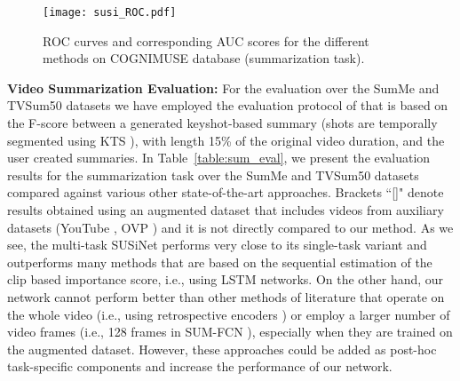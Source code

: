 \documentclass[10pt,twocolumn,letterpaper]{article}
\begin{document}
\begin{figure}[t]
\begin{center}
\hspace{-1cm}
\texttt{[image: susi\_ROC.pdf]}
\end{center}
\vspace{-0.4cm}
   \caption{ROC curves and corresponding AUC scores for the different methods on \mbox{COGNIMUSE} database (summarization task).}
\label{fig:roc_cogn}
\vspace{-0.3cm}
\end{figure}

\noindent\textbf{Video Summarization Evaluation:} For the evaluation over the SumMe and TVSum50 datasets we have employed the evaluation protocol of \cite{zhang2016video} that is based on the F-score between a generated keyshot-based summary (shots are temporally segmented using KTS \cite{potapov2014category}), with length 15\% of the original video duration, and the user created summaries. In Table~\ref{table:sum_eval}, we present the evaluation results for the summarization task over the SumMe and TVSum50 datasets compared against various other state-of-the-art approaches. Brackets ``[]" denote results obtained using an augmented dataset that includes videos from auxiliary datasets (YouTube \cite{de2011vsumm}, OVP \cite{de2011vsumm,ovp}) and it is not directly compared to our method. As we see, the multi-task SUSiNet performs very close to its single-task variant and outperforms many methods that are based on the sequential estimation of the clip based importance score, i.e., using LSTM networks. On the other hand, our network cannot perform better than other methods of  literature that operate on the whole video (i.e., using retrospective encoders \cite{zhang2018retrospective}) or employ a larger number of video frames (i.e., 128 frames in SUM-FCN \cite{rochan2018video}), especially when they are trained on the augmented dataset. However, these approaches could be added as post-hoc task-specific components and increase the performance of our network.
\end{document}
